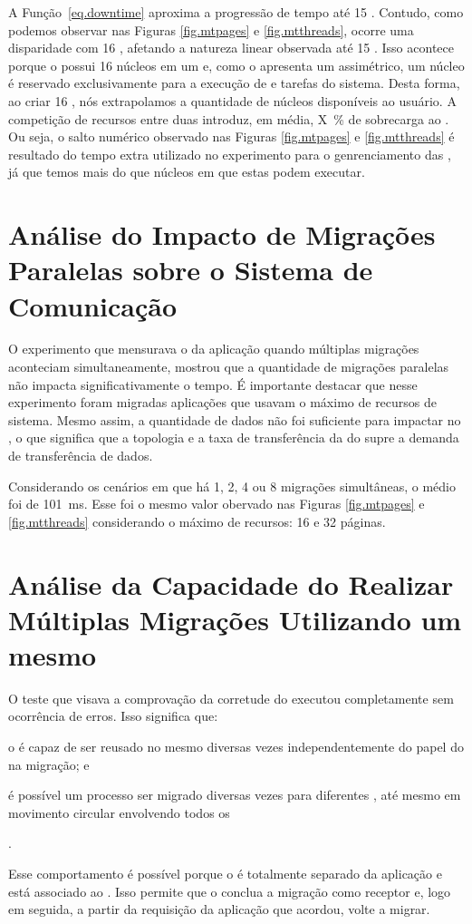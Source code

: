 A Função~\ref{eq.downtime} aproxima a progressão de tempo até 15 \threads. Contudo, como podemos observar nas Figuras \ref{fig.mtpages} e \ref{fig.mtthreads}, ocorre uma disparidade com 16 \threads, afetando a natureza linear observada até 15 \threads. Isso acontece porque o \mppa possui 16 núcleos em um \cluster e, como o \nanvix apresenta um \microkernel assimétrico, um núcleo é reservado exclusivamente para a execução de \threads e tarefas do sistema. Desta forma, ao criar 16 \threads, nós extrapolamos a quantidade de núcleos disponíveis ao usuário. A competição de recursos entre duas \threads introduz, em média, X~\% de sobrecarga ao \downtime. Ou seja, o salto numérico observado nas Figuras \ref{fig.mtpages} e \ref{fig.mtthreads} é resultado do tempo extra utilizado no experimento para o genrenciamento das \threads, já que temos mais \threads do que núcleos em que estas podem executar.

\section{Análise do Impacto de Migrações Paralelas sobre o Sistema de Comunicação}

O experimento que mensurava o \downtime da aplicação quando múltiplas migrações aconteciam simultaneamente, mostrou que a quantidade de migrações paralelas não impacta significativamente o tempo. É importante destacar que nesse experimento foram migradas aplicações que usavam o máximo de recursos de sistema. Mesmo assim, a quantidade de dados não foi suficiente para impactar no \downtime, o que significa que a topologia e a taxa de transferência da \noc do \mppa supre a demanda de transferência de dados.

Considerando os cenários em que há 1, 2, 4 ou 8 migrações simultâneas, o \downtime médio foi de 101~ms. Esse foi o mesmo valor obervado nas Figuras \ref{fig.mtpages} e \ref{fig.mtthreads} considerando o máximo de recursos: 16 \threads e 32 páginas.

\section{Análise da Capacidade do \daemon Realizar Múltiplas Migrações Utilizando um mesmo \cluster}

O teste que visava a comprovação da corretude do \daemon executou completamente sem ocorrência de erros. Isso significa que:
\begin{inlinelist}
    \item o \daemon é capaz de ser reusado no mesmo \cluster diversas vezes independentemente do papel do \cluster na migração; e
    \item é possível um processo ser migrado diversas vezes para diferentes \clusters, até mesmo em movimento circular envolvendo todos os \clusters
\end{inlinelist}.

Esse comportamento é possível porque o \daemon é totalmente separado da aplicação e está associado ao . Isso permite que o \daemon conclua a migração como receptor e, logo em seguida, a partir da requisição da aplicação que acordou, volte a migrar.
